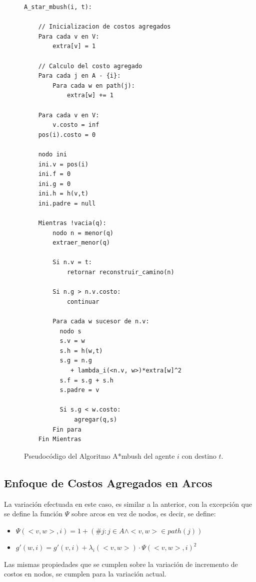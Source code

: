 \documentclass{egpubl}
\begin{document}
\begin{figure}[htb]
\begin{verbatim}
A_star_mbush(i, t):
    
    // Inicializacion de costos agregados
    Para cada v en V:
        extra[v] = 1
    
    // Calculo del costo agregado
    Para cada j en A - {i}:
        Para cada w en path(j):
            extra[w] += 1

    Para cada v en V:
        v.costo = inf
    pos(i).costo = 0

    nodo ini
    ini.v = pos(i)
    ini.f = 0
    ini.g = 0
    ini.h = h(v,t)
    ini.padre = null
    
    Mientras !vacia(q):
        nodo n = menor(q)
        extraer_menor(q)
        
        Si n.v = t:
            retornar reconstruir_camino(n)
        
        Si n.g > n.v.costo:
            continuar
        
        Para cada w sucesor de n.v:
          nodo s
          s.v = w
          s.h = h(w,t)
          s.g = n.g 
             + lambda_i(<n.v, w>)*extra[w]^2
          s.f = s.g + s.h
          s.padre = v
            
          Si s.g < w.costo:
              agregar(q,s)
        Fin para
    Fin Mientras
\end{verbatim}

\caption{\label{fig:ambush}
     Pseudocódigo del Algoritmo A*mbush del agente $i$ con destino $t$.}
\end{figure}

\subsection{Enfoque de Costos Agregados en Arcos}

La variación efectuada en este caso, es similar a la anterior,
con la excepción que se define la función $\Psi$ sobre arcos
en vez de nodos, es decir, se define:

\begin{itemize}
\item $\Psi(<v,w>,i) = 1+(\# j : j \in A \wedge <v,w> \in path(j))$
\item $g'(w, i) = g'(v,i) + \lambda_i(<v,w>) \cdot \Psi(<v,w>,i)^2$
\end{itemize}

Las mismas propiedades que se cumplen sobre la variación
de incremento de costos en nodos, se cumplen para la variación
actual.
\end{document}
